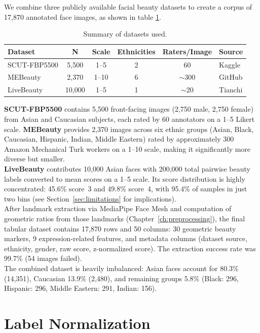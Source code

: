 \documentclass[a4paper,oneside,bibliography=totoc]{scrbook}
\begin{document}
We combine three publicly available facial beauty datasets to create a corpus of 17,870 annotated face images, as shown in table \ref{tab:datasets}.\\
\begin{table}[h]
\centering
\caption{Summary of datasets used.}
\label{tab:datasets}
\begin{tabular}{lccccl}
\toprule
\textbf{Dataset} & \textbf{N} & \textbf{Scale} & \textbf{Ethnicities} & \textbf{Raters/Image} & \textbf{Source} \\
\midrule
SCUT-FBP5500 & 5,500 & 1--5 & 2 & 60 & Kaggle \\
MEBeauty & 2,370 & 1--10 & 6 & ${\sim}$300 & GitHub \\
LiveBeauty & 10,000 & 1--5 & 1 & ${\sim}$20 & Tianchi \\
\bottomrule
\end{tabular}
\end{table}
\textbf{SCUT-FBP5500} \cite{liang2018scut} contains 5,500 front-facing images (2,750 male, 2,750 female) from Asian and Caucasian subjects, each rated by 60 annotators on a 1--5 Likert scale. \textbf{MEBeauty} \cite{lebedeva2021mebeauty} provides 2,370 images across six ethnic groups (Asian, Black, Caucasian, Hispanic, Indian, Middle Eastern) rated by approximately 300 Amazon Mechanical Turk workers on a 1--10 scale, making it significantly more diverse but smaller.\\\textbf{LiveBeauty} \cite{li2025livebeauty} contributes 10,000 Asian faces with 200,000 total pairwise beauty labels converted to mean scores on a 1--5 scale. Its score distribution is highly concentrated: 45.6\% score~3 and 49.8\% score~4, with 95.4\% of samples in just two bins (see Section~\ref{sec:limitations} for implications).\\
After landmark extraction via MediaPipe Face Mesh and computation of geometric ratios from those landmarks (Chapter~\ref{ch:preprocessing}), the final tabular dataset contains 17,870 rows and 50 columns: 30 geometric beauty markers, 9 expression-related features, and metadata columns (dataset source, ethnicity, gender, raw score, z-normalized score). The extraction success rate was 99.7\% (54 images failed).\\
The combined dataset is heavily imbalanced: Asian faces account for 80.3\% (14,351), Caucasian 13.9\% (2,480), and remaining groups 5.8\% (Black: 296, Hispanic: 296, Middle Eastern: 291, Indian: 156).\\

\section{Label Normalization}
\end{document}
